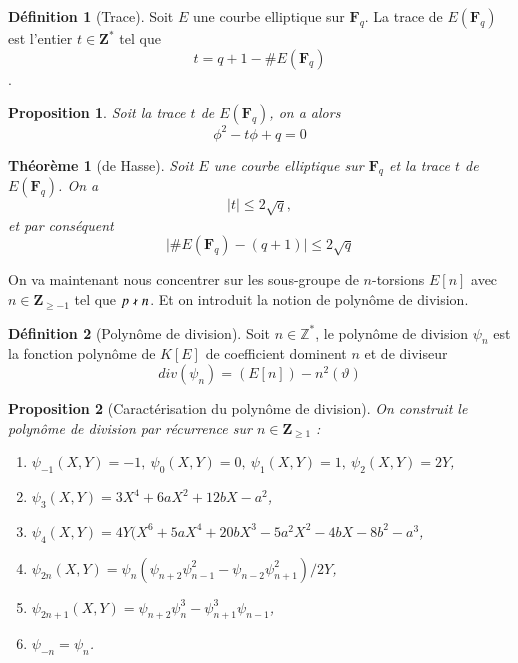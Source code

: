 \documentclass{article}%
\theoremstyle{plain}
\newtheorem{theoreme}{Théorème}[section]
\theoremstyle{definition}
\newtheorem{definition}{Définition}[section]
\theoremstyle{plain}
\newtheorem{proposition}{Proposition}[section]
\theoremstyle{plain}
\theoremstyle{remark}
\newcommand\fq{\mathbf{F}_{q}}
\begin{document}
\begin{definition}[Trace]
Soit $E$ une courbe elliptique sur $\fq$. La trace de $E(\fq)$ est l'entier $t\in\mathbf{Z^{*}}$ tel que  
\begin{equation}
t=q+1-\#E(\fq)
\label{trace}
\end{equation}.
\end{definition}

\begin{proposition}
Soit la trace $t$ de $E(\fq)$, on a alors 
\begin{equation}
\phi^{2} - t\phi + q = 0
\label{trace1}
\end{equation}
\end{proposition}

\begin{theoreme}[de Hasse]
Soit $E$ une courbe elliptique sur $\fq$ et la trace $t$ de $E(\fq)$.
On a \begin{equation}
\mid t\mid\leq 2\sqrt{q},
\label{hasse}
\end{equation}
et par conséquent
\begin{equation}
\mid\#E(\fq)-(q+1)\mid\leq 2\sqrt{q}
\label{hasse1}
\end{equation}
\end{theoreme}

On va maintenant nous concentrer sur les sous-groupe de $n$-torsions $E[n]$ avec $n\in\mathbf{Z}_{\geq -1}$ tel que $p\nshortmid n$. Et on introduit la notion de polynôme de division.

\begin{definition}[Polynôme de division]
Soit $n\in\mathbb{Z}^{*}$, le polynôme de division $\psi_{n}$ est la fonction polynôme de $K[E]$ de coefficient dominent $n$ et de diviseur $$div(\psi_{n})=(E[n])-n^{2}(\vartheta)$$
\end{definition}

\begin{proposition}[Caractérisation du polynôme de division]
On construit le polynôme de division par récurrence sur $n\in\mathbf{Z}_{\geq 1}$ :
\begin{enumerate}
\item $\psi_{-1}(X,Y)=-1,\ \psi_{0}(X,Y)=0,\ \psi_{1}(X,Y)=1,\ \psi_{2}(X,Y)=2Y$,
\item $\psi_{3}(X,Y)=3X^{4} + 6aX^{2} + 12bX - a^{2}$,
\item $\psi_{4}(X,Y)=4Y(X^{6} + 5aX^{4} + 20bX^{3} - 5a^{2}X^{2} - 4bX - 8b^{2} - a^{3}$,
\item $\psi_{2n}(X,Y)=\psi_{n}(\psi_{n+2}\psi_{n-1}^{2} - \psi_{n-2}\psi_{n+1}^{2})/2Y$,
\item $\psi_{2n+1}(X,Y)=\psi_{n+2}\psi_{n}^{3} - \psi_{n+1}^{3}\psi_{n-1}$,
\item $\psi_{-n}=\psi_{n}$.
\end{enumerate}
\end{proposition}
\end{document}
